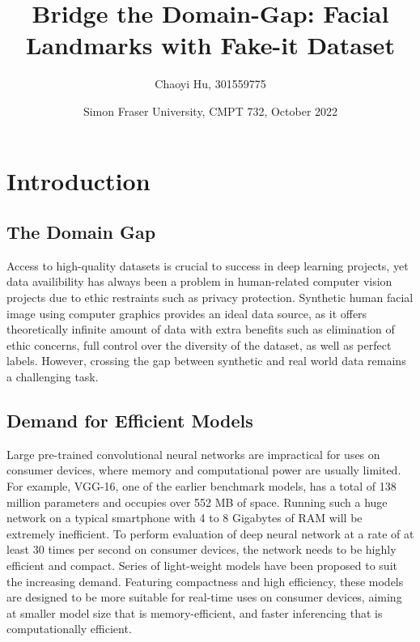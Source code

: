 \documentclass[12pt]{article}
\title{\textbf{Bridge the Domain-Gap: Facial Landmarks with Fake-it Dataset}}
\author{Chaoyi Hu, 301559775}
\date{Simon Fraser University, CMPT 732, October 2022}
\begin{document}
\maketitle

\section{Introduction}

\subsection{The Domain Gap}
Access to high-quality datasets is crucial to success in deep learning projects, yet data availibility has always been a problem in human-related computer vision projects due to ethic restraints such as privacy protection. Synthetic human facial image using computer graphics provides an ideal data source, as it offers theoretically infinite amount of data with extra benefits such as elimination of ethic concerns, full control over the diversity of the dataset, as well as perfect labels\cite{Wood.9302021}. However, crossing the gap between synthetic and real world data remains a challenging task.

\subsection{Demand for Efficient Models}
Large pre-trained convolutional neural networks are impractical for uses on consumer devices, where memory and computational power are usually limited. For example, VGG-16, one of the earlier benchmark models, has a total of 138 million parameters and occupies over 552 MB of space\cite{Simonyan.952014}. Running such a huge network on a typical smartphone with 4 to 8 Gigabytes of RAM will be extremely inefficient. To perform evaluation of deep neural network at a rate of at least 30 times per second on consumer devices, the network needs to be highly efficient and compact\cite{Ma.7302018}. Series of light-weight models have been proposed to suit the increasing demand. Featuring compactness and high efficiency, these models are designed to be more suitable for real-time uses on consumer devices, aiming at smaller model size that is memory-efficient, and faster inferencing that is computationally efficient.
\end{document}

